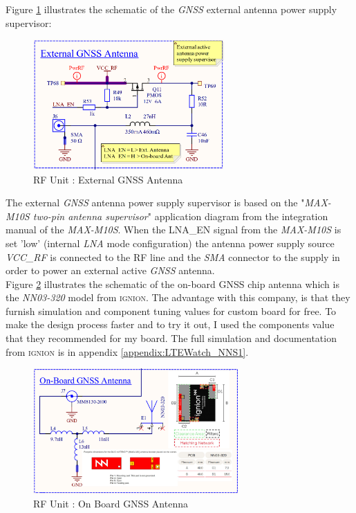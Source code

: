 \documentclass[report.tex]{subfiles}
\begin{document}
\pagebreak

Figure \ref{fig:LTEWatch_LTEW_RF_Unit_Ext_GNSS_Antenna} illustrates the schematic of the \textit{GNSS} external antenna power supply supervisor:

\begin{figure}[H]
	\centering
	\includegraphics[width=0.65\textwidth]{Include/Figure/Hardware/LTEWatch_LTEW_RF_Unit_Ext_GNSS_Antenna}
	\caption{RF Unit : External GNSS Antenna}
	\label{fig:LTEWatch_LTEW_RF_Unit_Ext_GNSS_Antenna}
\end{figure}

The external \textit{GNSS} antenna power supply supervisor is based on the "\textit{MAX-M10S two-pin antenna supervisor}" application diagram from the integration manual of the \textit{MAX-M10S}\cite{MAXM10SINT}. When the LNA\_EN signal from the \textit{MAX-M10S} is set 'low' (internal \textit{LNA} mode configuration) the antenna power supply source \textit{VCC\_RF} is connected to the RF line and the \textit{SMA} connector to the supply in order to power an external active \textit{GNSS} antenna.\\

Figure \ref{fig:LTEWatch_LTEW_RF_Unit_OnBoard_GNSS_Antenna} illustrates the schematic of the on-board GNSS chip antenna which is the \textit{NN03-320} model from \textsc{ignion}. The advantage with this company, is that they furnish simulation and component tuning values for custom board for free. To make the design process faster and to try it out, I used the components value that they recommended for my board. The full simulation and documentation from \textsc{ignion} is in appendix \ref{appendix:LTEWatch_NNS1}.

\begin{figure}[H]
	\centering
	\includegraphics[width=0.7\textwidth]{Include/Figure/Hardware/LTEWatch_LTEW_RF_Unit_OnBoard_GNSS_Antenna}
	\caption{RF Unit : On Board GNSS Antenna}
	\label{fig:LTEWatch_LTEW_RF_Unit_OnBoard_GNSS_Antenna}
\end{figure}
\end{document}
